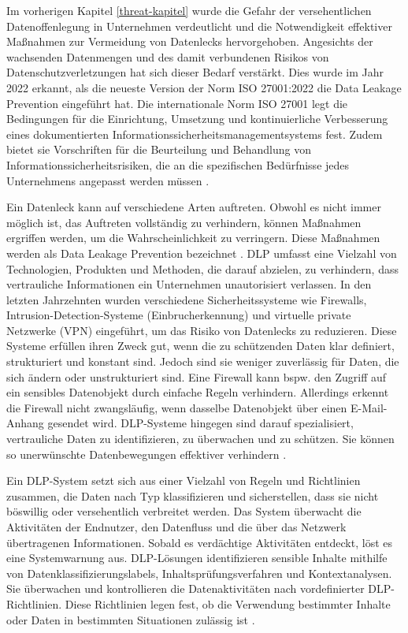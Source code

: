 Im vorherigen Kapitel \ref{threat-kapitel} wurde die Gefahr der versehentlichen Datenoffenlegung in Unternehmen verdeutlicht und die Notwendigkeit effektiver Maßnahmen zur Vermeidung von Datenlecks hervorgehoben. Angesichts der wachsenden Datenmengen und des damit verbundenen Risikos von Datenschutzverletzungen hat sich dieser Bedarf verstärkt. Dies wurde im Jahr 2022 erkannt, als die neueste Version der Norm ISO 27001:2022 die Data Leakage Prevention eingeführt hat. Die internationale Norm ISO 27001 legt die Bedingungen für die Einrichtung, Umsetzung und kontinuierliche Verbesserung eines dokumentierten Informationssicherheitsmanagementsystems fest. Zudem bietet sie Vorschriften für die Beurteilung und Behandlung von Informationssicherheitsrisiken, die an die spezifischen Bedürfnisse jedes Unternehmens angepasst werden müssen \cite{Monev.2023}.

Ein Datenleck kann auf verschiedene Arten auftreten. Obwohl es nicht immer möglich ist, das Auftreten vollständig zu verhindern, können Maßnahmen ergriffen werden, um die Wahrscheinlichkeit zu verringern. Diese Maßnahmen werden als Data Leakage Prevention bezeichnet \cite{Monev.2023}. DLP umfasst eine Vielzahl von Technologien, Produkten und Methoden, die darauf abzielen, zu verhindern, dass vertrauliche Informationen ein Unternehmen unautorisiert verlassen. In den letzten Jahrzehnten wurden verschiedene Sicherheitssysteme wie Firewalls, Intrusion-Detection-Systeme (Einbrucherkennung) und virtuelle private Netzwerke (VPN) eingeführt, um das Risiko von Datenlecks zu reduzieren. Diese Systeme erfüllen ihren Zweck gut, wenn die zu schützenden Daten klar definiert, strukturiert und konstant sind. Jedoch sind sie weniger zuverlässig für Daten, die sich ändern oder unstrukturiert sind.  Eine Firewall kann bspw. den Zugriff auf ein sensibles Datenobjekt durch einfache Regeln verhindern. Allerdings erkennt die Firewall nicht zwangsläufig, wenn dasselbe Datenobjekt über einen E-Mail-Anhang gesendet wird. DLP-Systeme hingegen sind darauf spezialisiert, vertrauliche Daten zu identifizieren, zu überwachen und zu schützen. Sie können so unerwünschte Datenbewegungen effektiver verhindern \cite{Alneyadi.2016}.

Ein DLP-System setzt sich aus einer Vielzahl von Regeln und Richtlinien zusammen, die Daten nach Typ klassifizieren und sicherstellen, dass sie nicht böswillig oder versehentlich verbreitet werden. Das System überwacht die Aktivitäten der Endnutzer, den Datenfluss und die über das Netzwerk übertragenen Informationen. Sobald es verdächtige Aktivitäten entdeckt, löst es eine Systemwarnung aus. DLP-Lösungen identifizieren sensible Inhalte mithilfe von Datenklassifizierungslabels, Inhaltsprüfungsverfahren und Kontextanalysen. Sie überwachen und kontrollieren die Datenaktivitäten nach vordefinierter DLP-Richtlinien. Diese Richtlinien legen fest, ob die Verwendung bestimmter Inhalte oder Daten in bestimmten Situationen zulässig ist \cite{Chugh.2023}.

